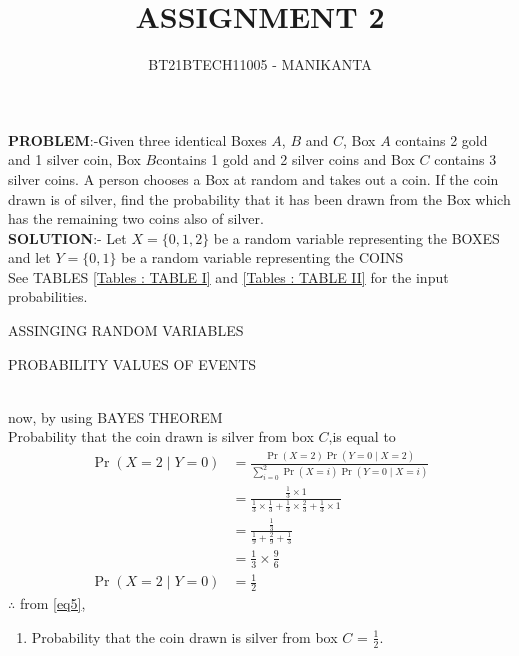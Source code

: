 \documentclass[journal,12pt,twocolumn]{IEEEtran}
\providecommand{\pr}[1]{\ensuremath{\Pr\left(#1\right)}}
\begin{document}
\vspace{3cm}
\title{ASSIGNMENT 2}
\author{BT21BTECH11005 - MANIKANTA}

\maketitle
\textbf{PROBLEM}:-Given three identical Boxes $A$, $B$ and $C$, Box $A$ contains 2 gold and 1 silver coin, Box $B $contains 1 gold and 2 silver coins and Box $C$ contains 3 silver coins. A person chooses a Box at random and takes out a coin. If the coin drawn is of silver, find the probability that it has been drawn from the Box which has the remaining two coins also of silver.\\

\textbf{SOLUTION}:-
Let $X=\{0,1,2\}$ be a random variable representing the BOXES and let $Y=\{0,1\}$ be a random variable representing the COINS \\

See TABLES \eqref{Tables : TABLE  I} and \eqref{Tables : TABLE II} for the input probabilities.
\begin{table}[ht!]
\centering
 
\caption{ASSINGING RANDOM VARIABLES}
\label{Tables : TABLE I}
\end{table}

 \begin{table}[ht!]
 
\caption{PROBABILITY VALUES OF EVENTS}
\label{Tables : TABLE II}
\end{table}\\

now,
by using BAYES THEOREM\\
Probability that the coin drawn is silver from box $C$,is equal to
\begin{align}
\pr{X = 2 \mid Y = 0} &= \frac{\pr{X = 2}\pr{Y = 0 \mid X = 2}}{\sum_{i=0}^{2} \pr{X = i}\pr{Y=0 \mid X = i}}\label{eq1}\\
 &= \frac{\frac{1}{3} \times 1}{\frac{1}{3} \times \frac{1}{3}+\frac{1}{3} \times \frac{2}{3}+\frac{1}{3} \times 1
 }\label{eq2}\\
 &= \frac{\frac{1}{3}}{\frac{1}{9}+\frac{2}{9}+\frac{1}{3}}\label{eq3}\\
 &= \frac{1}{3} \times \frac{9}{6}\label{eq4}\\
 \pr{X = 2 \mid Y = 0} &= \frac{1}{2}\label{eq5}
\end{align}
$\therefore$ from \eqref{eq5},\\
\begin{enumerate}[label=]
\item Probability that the coin drawn is silver from box $C$ = $\frac{1}{2}$.
\end{enumerate}
\end{document}
